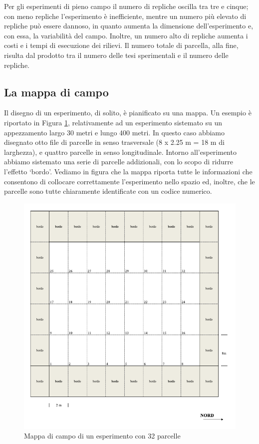 \documentclass[a4paper,12pt,oneside]{book}
\begin{document}
Per gli esperimenti di pieno campo il numero di repliche oscilla tra tre e cinque; con meno repliche l'esperimento è inefficiente, mentre un numero più elevato di repliche può essere dannoso, in quanto aumenta la dimensione dell'esperimento e, con essa, la variabilità del campo. Inoltre, un numero alto di repliche aumenta i costi e i tempi di esecuzione dei rilievi. Il numero totale di parcella, alla fine, risulta dal prodotto tra il numero delle tesi sperimentali e il numero delle repliche.

\hypertarget{la-mappa-di-campo}{%
\subsection{La mappa di campo}\label{la-mappa-di-campo}}

Il disegno di un esperimento, di solito, è pianificato su una mappa. Un esempio è riportato in Figura \ref{fig:figName31}, relativamente ad un esperimento sistemato su un appezzamento largo 30 metri e lungo 400 metri. In questo caso abbiamo disegnato otto file di parcelle in senso trasversale (8 x 2.25 m = 18 m di larghezza), e quattro parcelle in senso longitudinale. Intorno all'esperimento abbiamo sistemato una serie di parcelle addizionali, con lo scopo di ridurre l'effetto `bordo'. Vediamo in figura che la mappa riporta tutte le informazioni che consentono di collocare correttamente l'esperimento nello spazio ed, inoltre, che le parcelle sono tutte chiaramente identificate con un codice numerico.

\begin{figure}

{\centering \includegraphics[width=0.9\linewidth]{_images/Mappa1} 

}

\caption{Mappa di campo di un esperimento con 32 parcelle}\label{fig:figName31}
\end{figure}
\end{document}
